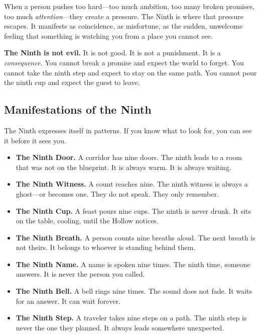 \documentclass[11pt]{book}
\begin{document}
When a person pushes too hard---too much ambition, too many broken promises, too much \textit{attention}---they create a pressure. The Ninth is where that pressure escapes. It manifests as coincidence, as misfortune, as the sudden, unwelcome feeling that something is watching you from a place you cannot see.

\textbf{The Ninth is not evil.} It is not good. It is not a punishment. It is a \textit{consequence}. You cannot break a promise and expect the world to forget. You cannot take the ninth step and expect to stay on the same path. You cannot pour the ninth cup and expect the guest to leave.

\subsection{Manifestations of the Ninth}

The Ninth expresses itself in patterns. If you know what to look for, you can see it before it sees you.

\begin{tcolorbox}[colback=shadowpurple!5!white, colframe=shadowpurple!75!black, title=Signs of the Ninth,breakable]
\begin{itemize}
  \item \textbf{The Ninth Door.} A corridor has nine doors. The ninth leads to a room that was not on the blueprint. It is always warm. It is always waiting.
  \item \textbf{The Ninth Witness.} A count reaches nine. The ninth witness is always a ghost---or becomes one. They do not speak. They only remember.
  \item \textbf{The Ninth Cup.} A feast pours nine cups. The ninth is never drunk. It sits on the table, cooling, until the Hollow notices.
  \item \textbf{The Ninth Breath.} A person counts nine breaths aloud. The next breath is not theirs. It belongs to whoever is standing behind them.
  \item \textbf{The Ninth Name.} A name is spoken nine times. The ninth time, someone answers. It is never the person you called.
  \item \textbf{The Ninth Bell.} A bell rings nine times. The sound does not fade. It waits for an answer. It can wait forever.
  \item \textbf{The Ninth Step.} A traveler takes nine steps on a path. The ninth step is never the one they planned. It always leads somewhere unexpected.
\end{itemize}
\end{tcolorbox}
\end{document}
